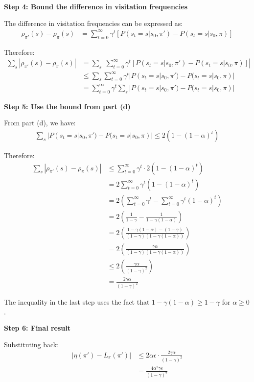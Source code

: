 \textbf{Step 4: Bound the difference in visitation frequencies}

The difference in visitation frequencies can be expressed as:
\begin{align}
\rho_{\pi'}(s) - \rho_{\pi}(s) &= \sum_{t=0}^{\infty} \gamma^t [P(s_t = s | s_0, \pi') - P(s_t = s | s_0, \pi)]
\end{align}

Therefore:
\begin{align}
\sum_{s} |\rho_{\pi'}(s) - \rho_{\pi}(s)| &= \sum_{s} \left| \sum_{t=0}^{\infty} \gamma^t [P(s_t = s | s_0, \pi') - P(s_t = s | s_0, \pi)] \right| \\
&\le \sum_{s} \sum_{t=0}^{\infty} \gamma^t |P(s_t = s | s_0, \pi') - P(s_t = s | s_0, \pi)| \\
&= \sum_{t=0}^{\infty} \gamma^t \sum_{s} |P(s_t = s | s_0, \pi') - P(s_t = s | s_0, \pi)|
\end{align}

\textbf{Step 5: Use the bound from part (d)}

From part (d), we have:
\begin{align}
\sum_{s} |P(s_t = s | s_0, \pi') - P(s_t = s | s_0, \pi)| \le 2(1-(1-\alpha)^t)
\end{align}

Therefore:
\begin{align}
\sum_{s} |\rho_{\pi'}(s) - \rho_{\pi}(s)| &\le \sum_{t=0}^{\infty} \gamma^t \cdot 2(1-(1-\alpha)^t) \\
&= 2 \sum_{t=0}^{\infty} \gamma^t (1-(1-\alpha)^t) \\
&= 2 \left( \sum_{t=0}^{\infty} \gamma^t - \sum_{t=0}^{\infty} \gamma^t (1-\alpha)^t \right) \\
&= 2 \left( \frac{1}{1-\gamma} - \frac{1}{1-\gamma(1-\alpha)} \right) \\
&= 2 \left( \frac{1-\gamma(1-\alpha) - (1-\gamma)}{(1-\gamma)(1-\gamma(1-\alpha))} \right) \\
&= 2 \left( \frac{\gamma\alpha}{(1-\gamma)(1-\gamma(1-\alpha))} \right) \\
&\le 2 \left( \frac{\gamma\alpha}{(1-\gamma)^2} \right) \\
&= \frac{2\gamma\alpha}{(1-\gamma)^2}
\end{align}

The inequality in the last step uses the fact that $1-\gamma(1-\alpha) \ge 1-\gamma$ for $\alpha \ge 0$.

\textbf{Step 6: Final result}

Substituting back:
\begin{align}
|\eta(\pi') - L_{\pi}(\pi')| &\le 2\alpha\epsilon \cdot \frac{2\gamma\alpha}{(1-\gamma)^2} \\
&= \frac{4\alpha^2\gamma\epsilon}{(1-\gamma)^2}
\end{align}


